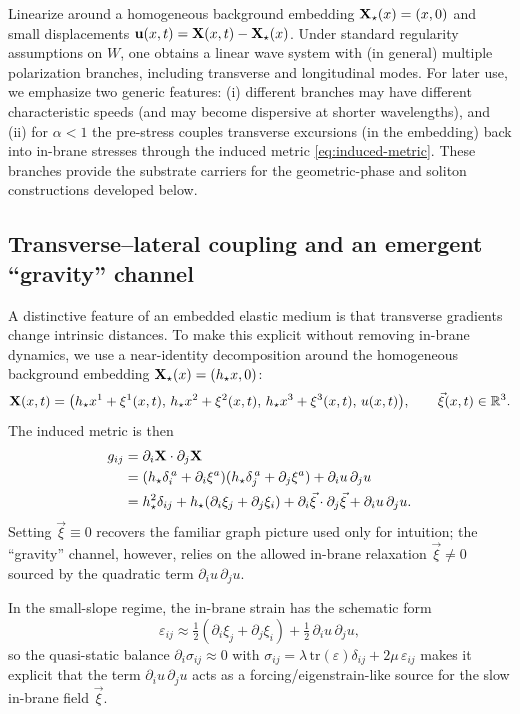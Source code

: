 Linearize around a homogeneous background embedding $\mathbf{X}_\star(x)=(x,0)$ and small displacements
$\mathbf{u}(x,t)=\mathbf{X}(x,t)-\mathbf{X}_\star(x)$.
Under standard regularity assumptions on $W$, one obtains a linear wave system with (in general) multiple
polarization branches, including transverse and longitudinal modes.
For later use, we emphasize two generic features:
(i) different branches may have different characteristic speeds (and may become dispersive at shorter wavelengths),
and (ii) for $\alpha<1$ the pre-stress couples transverse excursions (in the embedding) back into in-brane stresses
through the induced metric \eqref{eq:induced-metric}.
These branches provide the substrate carriers for the geometric-phase and soliton constructions developed below.

\subsection{Transverse--lateral coupling and an emergent ``gravity'' channel}
\label{subsec:gravity-channel}

A distinctive feature of an embedded elastic medium is that transverse gradients change intrinsic distances.
To make this explicit without removing in-brane dynamics, we use a near-identity decomposition around the
homogeneous background embedding $\mathbf{X}_\star(x)=(h_\star x,0)$:
\begin{equation}
  \mathbf{X}(x,t)=\big(h_\star x^1+\xi^1(x,t),\,h_\star x^2+\xi^2(x,t),\,h_\star x^3+\xi^3(x,t),\,u(x,t)\big),
  \qquad \vec\xi(x,t)\in\mathbb{R}^3.
  \label{eq:near-identity-embedding}
\end{equation}
The induced metric is then
\begin{align}
  g_{ij}
  &= \partial_i\mathbf{X}\cdot\partial_j\mathbf{X} \nonumber\\
  &= (h_\star\delta_i^{\,a}+\partial_i\xi^a)(h_\star\delta_j^{\,a}+\partial_j\xi^a)+\partial_i u\,\partial_j u \nonumber\\
  &= h_\star^2\delta_{ij}+h_\star(\partial_i\xi_j+\partial_j\xi_i)+\partial_i\vec\xi\cdot\partial_j\vec\xi+\partial_i u\,\partial_j u.
  \label{eq:metric-near-identity}
\end{align}
Setting $\vec\xi\equiv 0$ recovers the familiar graph picture used only for intuition; the ``gravity'' channel,
however, relies on the allowed in-brane relaxation $\vec\xi\neq 0$ sourced by the quadratic term
$\partial_i u\,\partial_j u$.

In the small-slope regime, the in-brane strain has the schematic form
\begin{equation}
  \varepsilon_{ij}\approx \tfrac12(\partial_i\xi_j+\partial_j\xi_i)+\tfrac12\,\partial_i u\,\partial_j u,
  \label{eq:strain-near-identity}
\end{equation}
so the quasi-static balance $\partial_i\sigma_{ij}\approx 0$ with
$\sigma_{ij}=\lambda\,\mathrm{tr}(\varepsilon)\delta_{ij}+2\mu\,\varepsilon_{ij}$ makes it explicit that
the term $\partial_i u\,\partial_j u$ acts as a forcing/eigenstrain-like source for the slow in-brane field
$\vec\xi$.

